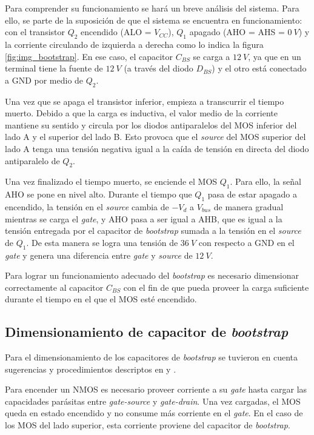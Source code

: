 \noindent Para comprender su funcionamiento se hará un breve análisis del sistema. Para ello, se parte de la suposición de que el sistema se encuentra en funcionamiento: con el transistor $Q_2$ encendido (ALO = $V_{CC}$), $Q_1$ apagado (AHO = AHS = $0\:V$) y la corriente circulando de izquierda a derecha como lo indica la figura \ref{fig:img_bootstrap}. En ese caso, el capacitor $C_{BS}$ se carga a $12\:V$, ya que en un terminal tiene la fuente de $12\:V$ (a través del diodo $D_{BS}$) y el otro está conectado a GND por medio de $Q_2$.

\noindent Una vez que se apaga el transistor inferior, empieza a transcurrir el tiempo muerto. Debido a que la carga es inductiva, el valor medio de la corriente mantiene su sentido y circula por los diodos antiparalelos del MOS inferior del lado A y el superior del lado B. Esto provoca que el \textsl{source} del MOS superior del lado A tenga una tensión negativa igual a la caída de tensión en directa del diodo antiparalelo de $Q_2$. 

\noindent Una vez finalizado el tiempo muerto, se enciende el MOS $Q_1$. Para ello, la señal AHO se pone en nivel alto. Durante el tiempo que $Q_1$ pasa de estar apagado a encendido, la tensión en el \textsl{source} cambia de $-V_d$ a $V_{bus}$ de manera gradual mientras se carga el \textsl{gate}, y AHO pasa a ser igual a AHB, que es igual a la tensión entregada por el capacitor de \textsl{bootstrap} sumada a la tensión en el \textsl{source} de $Q_1$. De esta manera se logra una tensión de $36\:V$ con respecto a GND en el \textsl{gate} y genera una diferencia entre \textsl{gate} y \textsl{source} de $12\:V$.

\noindent Para lograr un funcionamiento adecuado del \textsl{bootstrap} es necesario dimensionar correctamente al capacitor $C_{BS}$ con el fin de que pueda proveer la carga suficiente durante el tiempo en el que el MOS esté encendido.


\subsection{Dimensionamiento de capacitor de \textsl{bootstrap}}

\noindent Para el dimensionamiento de los capacitores de \textsl{bootstrap} se tuvieron en cuenta sugerencias y procedimientos descriptos en \cite{HIP4081A_AN9405} y \cite{HIP4081A_FN3659}.

\noindent Para encender un NMOS es necesario proveer corriente a su \textsl{gate} hasta cargar las capacidades parásitas entre \textsl{gate-source} y \textsl{gate-drain}. Una vez cargadas, el MOS queda en estado encendido y no consume más corriente en el \textsl{gate}. En el caso de los MOS del lado superior, esta corriente proviene del capacitor de \textsl{bootstrap}. 

